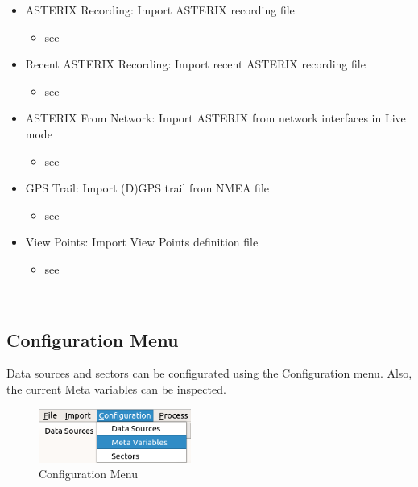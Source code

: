 \begin{itemize}
 \item ASTERIX Recording: Import ASTERIX recording file
 \begin{itemize}
 \item see 
 \end{itemize}
 \item Recent ASTERIX Recording: Import recent ASTERIX recording file
  \begin{itemize}
 \item see 
 \end{itemize}
 \item ASTERIX From Network: Import ASTERIX from network interfaces in Live mode
  \begin{itemize}
 \item see 
 \end{itemize}
 \item GPS Trail: Import (D)GPS trail from NMEA file
  \begin{itemize}
 \item see 
 \end{itemize}
 \item View Points: Import View Points definition file
  \begin{itemize}
 \item see 
 \end{itemize}
\end{itemize}
\  \\

\subsection{Configuration Menu}
\label{sec:ui_overview_config_menu}

Data sources and sectors can be configurated using the Configuration menu. Also, the current Meta variables can be inspected.

\begin{figure}[H]
  \center
    \includegraphics[width=5cm,frame]{figures/ui_configuration_menu.png}
  \caption{Configuration Menu}
\end{figure}

